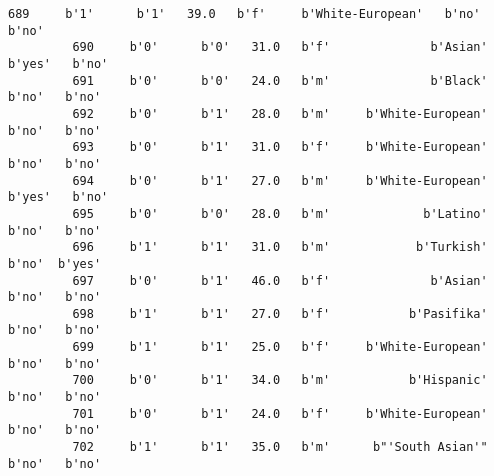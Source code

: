 \documentclass[11pt]{article}
\begin{document}
\begin{Verbatim}[commandchars=\\\{\}]
         689     b'1'      b'1'   39.0   b'f'     b'White-European'   b'no'   b'no'   
         690     b'0'      b'0'   31.0   b'f'              b'Asian'  b'yes'   b'no'   
         691     b'0'      b'0'   24.0   b'm'              b'Black'   b'no'   b'no'   
         692     b'0'      b'1'   28.0   b'm'     b'White-European'   b'no'   b'no'   
         693     b'0'      b'1'   31.0   b'f'     b'White-European'   b'no'   b'no'   
         694     b'0'      b'1'   27.0   b'm'     b'White-European'  b'yes'   b'no'   
         695     b'0'      b'0'   28.0   b'm'             b'Latino'   b'no'   b'no'   
         696     b'1'      b'1'   31.0   b'm'            b'Turkish'   b'no'  b'yes'   
         697     b'0'      b'1'   46.0   b'f'              b'Asian'   b'no'   b'no'   
         698     b'1'      b'1'   27.0   b'f'           b'Pasifika'   b'no'   b'no'   
         699     b'1'      b'1'   25.0   b'f'     b'White-European'   b'no'   b'no'   
         700     b'0'      b'1'   34.0   b'm'           b'Hispanic'   b'no'   b'no'   
         701     b'0'      b'1'   24.0   b'f'     b'White-European'   b'no'   b'no'   
         702     b'1'      b'1'   35.0   b'm'      b"'South Asian'"   b'no'   b'no'   
         

\end{Verbatim}
\end{document}
